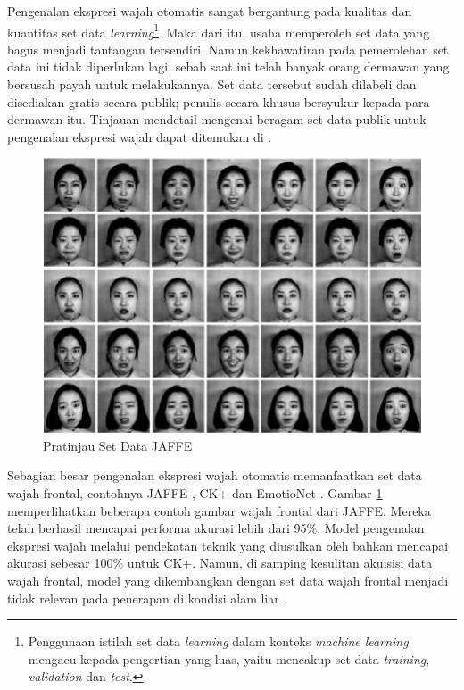 Pengenalan ekspresi wajah otomatis sangat bergantung pada kualitas dan kuantitas set data \textit{learning}\footnote{Penggunaan istilah set data \textit{learning} dalam konteks \textit{machine learning} mengacu kepada pengertian yang luas, yaitu mencakup set data \textit{training}, \textit{validation} dan \textit{test}.}. Maka dari itu, usaha memperoleh set data yang bagus menjadi tantangan tersendiri. Namun kekhawatiran pada pemerolehan set data ini tidak diperlukan lagi, sebab saat ini telah banyak orang dermawan yang bersusah payah untuk melakukannya. Set data tersebut sudah dilabeli dan disediakan gratis secara publik; penulis secara khusus bersyukur kepada para dermawan itu. Tinjauan mendetail mengenai beragam set data publik untuk pengenalan ekspresi wajah dapat ditemukan di .


\begin{figure}[t]
    \centering
    \includegraphics[width=14cm]{gambar/pratinjau_jaffe.jpg}
    \caption[Pratinjau Set Data JAFFE]{Pratinjau Set Data JAFFE \protect{}}
    \label{fig:pratinjaujaffe}
\end{figure}
Sebagian besar pengenalan ekspresi wajah otomatis memanfaatkan set data wajah frontal, contohnya JAFFE , CK+  dan EmotioNet . Gambar \ref{fig:pratinjaujaffe} memperlihatkan beberapa contoh gambar wajah frontal dari JAFFE. Mereka telah berhasil mencapai performa akurasi lebih dari 95\%. Model pengenalan ekspresi wajah melalui pendekatan teknik yang diusulkan oleh  bahkan mencapai akurasi sebesar 100\% untuk CK+. Namun, di samping kesulitan akuisisi data wajah frontal, model yang dikembangkan dengan set data wajah frontal menjadi tidak relevan pada penerapan di kondisi alam liar .

